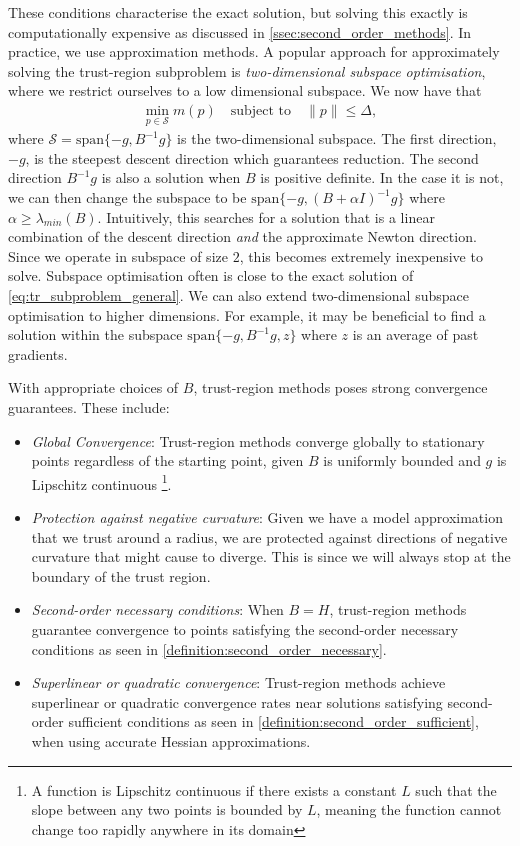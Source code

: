 These conditions characterise the exact solution, but solving this exactly is computationally expensive as discussed in \cref{ssec:second_order_methods}. In practice, we use approximation methods. A popular approach for approximately solving the trust-region subproblem is \textit{two-dimensional subspace optimisation}, where we restrict ourselves to a low dimensional subspace. We now have that 
\begin{align}
    \min_{p \in \mathcal{S}} m(p) \quad \text{subject to} \quad \|p\| \leq \Delta,
    \label{eq:subspace_tr_subproblem}
\end{align}
where $\mathcal{S} = \text{span}\{-g, B^{-1}g\}$ is the two-dimensional subspace. The first direction, $-g$, is the steepest descent direction which guarantees reduction. The second direction $B^{-1}g$ is also a solution when $B$ is positive definite. In the case it is not, we can then change the subspace to be $\text{span}\{-g, (B + \alpha I)^{-1}g\}$ where $\alpha \geq \lambda_{min}(B)$. Intuitively, this searches for a solution that is a linear combination of the descent direction \textit{and} the approximate Newton direction. Since we operate in subspace of size $2$, this becomes extremely inexpensive to solve. Subspace optimisation often is close to the exact solution of \cref{eq:tr_subproblem_general}. We can also extend two-dimensional subspace optimisation to higher dimensions. For example, it may be beneficial to find a solution within the subspace $\text{span}\{-g, B^{-1}g, z\}$ where $z$ is an average of past gradients. 

With appropriate choices of $B$, trust-region methods poses strong convergence guarantees. These include:
\begin{itemize}
    \item \textit{Global Convergence}: Trust-region methods converge globally to stationary points regardless of the starting point, given $B$ is uniformly bounded and $g$ is Lipschitz continuous \footnote{A function is Lipschitz continuous if there exists a constant $L$ such that the slope between any two points is bounded by $L$, meaning the function cannot change too rapidly anywhere in its domain}.
    \item \textit{Protection against negative curvature}: Given we have a model approximation that we trust around a radius, we are protected against directions of negative curvature that might cause to diverge. This is since we will always stop at the boundary of the trust region.
    \item \textit{Second-order necessary conditions}: When $B = H$, trust-region methods guarantee convergence to points satisfying the second-order necessary conditions as seen in \cref{definition:second_order_necessary}.
    \item \textit{Superlinear or quadratic convergence}: Trust-region methods achieve superlinear or quadratic convergence rates near solutions satisfying second-order sufficient conditions as seen in \cref{definition:second_order_sufficient}, when using accurate Hessian approximations.
\end{itemize}

